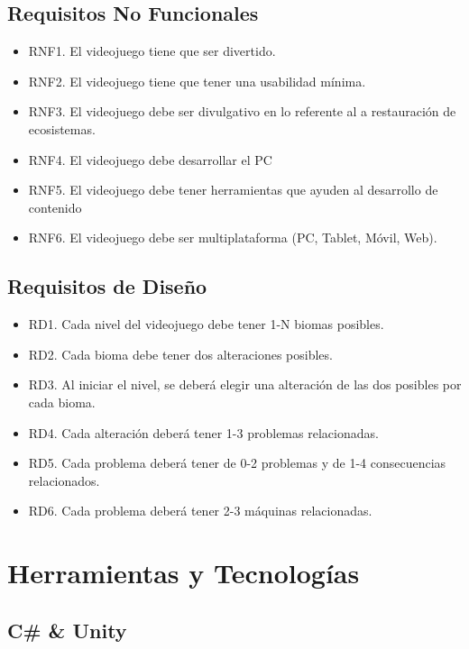 \subsection{Requisitos No Funcionales}

\begin{itemize}
    \item RNF1. El videojuego tiene que ser divertido.
    \item RNF2. El videojuego tiene que tener una usabilidad mínima.
    \item RNF3. El videojuego debe ser divulgativo en lo referente al a restauración de ecosistemas.
    \item RNF4. El videojuego debe desarrollar el PC
    \item RNF5. El videojuego debe tener herramientas que ayuden al desarrollo de contenido
    \item RNF6. El videojuego debe ser multiplataforma (PC, Tablet, Móvil, Web).
\end{itemize}

\subsection{Requisitos de Diseño}

\begin{itemize}
    \item RD1. Cada nivel del videojuego debe tener 1-N biomas posibles.
    \item RD2. Cada bioma debe tener dos alteraciones posibles.
    \item RD3. Al iniciar el nivel, se deberá elegir una alteración de las dos posibles por cada bioma.
    \item RD4. Cada alteración deberá tener 1-3 problemas relacionadas.
    \item RD5. Cada problema deberá tener de 0-2 problemas y de 1-4 consecuencias relacionados.
    \item RD6. Cada problema deberá tener 2-3 máquinas relacionadas.
\end{itemize}

\section{Herramientas y Tecnologías}

\subsection{C\# \& Unity}


